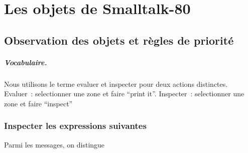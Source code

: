 



\ifx\wholebook\relax\else


\fi

\chapter{Les objets de Smalltalk-80}

%




\section{Observation des objets et r\`egles de priorit\'e }

\paragraph{Vocabulaire.} Nous utilisons le terme evaluer et inspecter pour deux actions distinctes. Evaluer~: selectionner une zone et faire ``print it''. 
Inspecter~: selectionner une zone et faire ``inspect''


\subsection{Inspecter les expressions suivantes}



Parmi les messages, on distingue 

